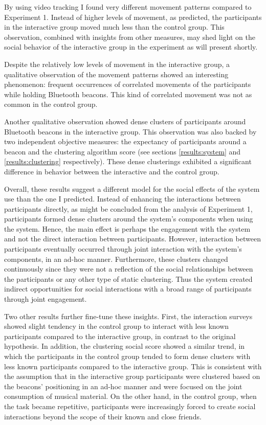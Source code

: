 \documentclass[a4paper,11pt]{article}
\begin{document}
{By using video tracking I found very different movement patterns compared to Experiment 1.
Instead of higher levels of movement, as predicted, the participants in the interactive group moved much less than the control group.
This observation, combined with insights from other measures, may shed light on the social behavior of the interactive group in the experiment as will present shortly.

Despite the relatively low levels of movement in the interactive group, a qualitative observation of the movement patterns showed an interesting phenomenon: frequent occurrences of correlated movements of the participants while holding Bluetooth beacons.
This kind of correlated movement was not as common in the control group.

Another qualitative observation showed dense clusters of participants around Bluetooth beacons in the interactive group.
This observation was also backed by two independent objective measures: the expectancy of participants around a beacon and the clustering algorithm score (see sections \ref{results:system} and \ref{results:clustering} respectively).
These dense clusterings exhibited a significant difference in behavior between the interactive and the control group.

Overall, these results suggest a different model for the social effects of the system use than the one I predicted.
Instead of enhancing the interactions between participants directly, as might be concluded from the analysis of Experiment 1, participants formed dense clusters around the system's components when using the system.
Hence, the main effect is perhaps the engagement with the system and not the direct interaction between participants.
However, interaction between participants eventually occurred through joint interaction with the system's components, in an ad-hoc manner.
Furthermore, these clusters changed continuously since they were not a reflection of the social relationships between the participants or any other type of static clustering.
Thus the system created indirect opportunities for social interactions with a broad range of participants through joint engagement.

Two other results further fine-tune these insights.
First, the interaction surveys showed slight tendency in the control group to interact with less known participants compared to the interactive group, in contrast to the original hypothesis.
In addition, the clustering social score showed a similar trend, in which the participants in the control group tended to form dense clusters with less known participants compared to the interactive group.
This is consistent with the assumption that in the interactive group participants were clustered based on the beacons' positioning in an ad-hoc manner and were focused on the joint consumption of musical material.
On the other hand, in the control group, when the task became repetitive, participants were increasingly forced to create social interactions beyond the scope of their known and close friends.

}
\end{document}
